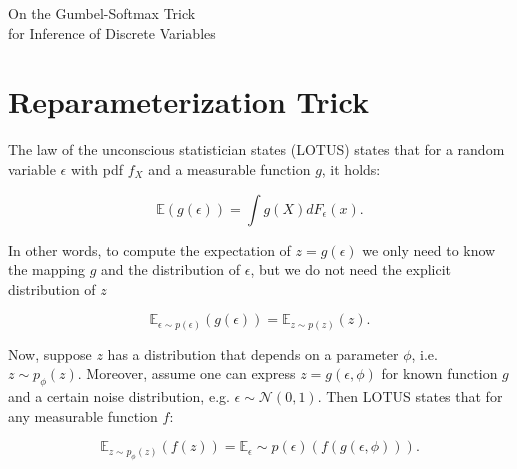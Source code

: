 \documentclass[11pt]{article}
\def\E{\mathbb{E}}
\def\eps{\epsilon}
\begin{document}
\begin{center}
	{\LARGE On the Gumbel-Softmax Trick\\[6pt] for Inference of Discrete Variables} 
\end{center}

\begin{abstract}
The re-parameterization trick enables optimizing stochastic computation graphs via gradient descent. The essence of the trick is to re-factor each stochastic node into a differentiable function of its parameters and a random variable with fixed distribution. After refactoring, the gradients of the loss propagated by the chain rule through the graph are low variance unbiased estimators of the gradients of the expected loss. While many continuous random variables have such re-parameterizations, discrete random variables lack useful re-parameterizations due to the discontinuous nature of discrete states. As a remedy, the concrete distribution serves as a continuous relaxation of discrete random variables.
\end{abstract}

\section{Reparameterization Trick}

The law of the unconscious statistician states (LOTUS) states that for a random variable $\eps$ with pdf $f_X$ and a measurable function $g$, it holds:

\begin{equation}
\E(g(\eps)) = \int g(X) d F_\eps(x).
\end{equation}

In other words, to compute the expectation of $z = g(\eps)$ we only need to know the mapping $g$ and the distribution of $\epsilon$, but we do not need the explicit distribution of $z$

\begin{equation}
\E_{\eps\sim p(\eps)}(g(\eps)) = \E_{z\sim p(z)}(z).
\end{equation}

Now, suppose $z$ has a distribution that depends on a parameter $\phi$, i.e. $z\sim p_\phi (z)$. Moreover, assume one can express $z = g(\eps, \phi)$ for known function $g$ and a certain noise distribution, e.g. $\eps\sim\mathcal{N}(0,1)$. Then LOTUS states that for any measurable function $f$:

\begin{equation}
\E_{z\sim p_\phi (z)}(f(z)) = \E_\eps\sim p(\eps)(f(g(\eps,\phi))).
\end{equation}
\end{document}
